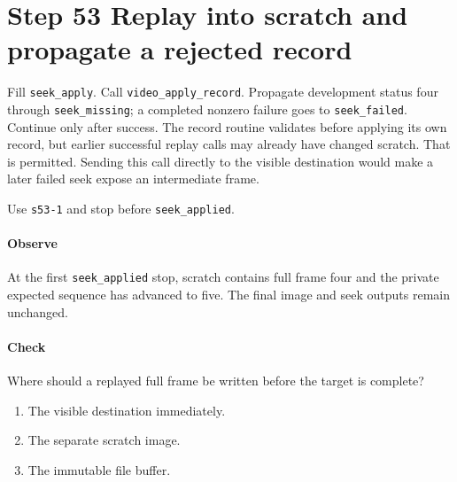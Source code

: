 \section{Step 53 Replay into scratch and propagate a rejected record}
Fill \texttt{seek\_apply}. Call \texttt{video\_apply\_record}. Propagate development status four through \texttt{seek\_missing}; a completed nonzero failure goes to \texttt{seek\_failed}. Continue only after success. The record routine validates before applying its own record, but earlier successful replay calls may already have changed scratch. That is permitted. Sending this call directly to the visible destination would make a later failed seek expose an intermediate frame.

Use \texttt{s53-1} and stop before \texttt{seek\_applied}.

\paragraph{Observe} At the first \texttt{seek\_applied} stop, scratch contains full frame four and the private expected sequence has advanced to five. The final image and seek outputs remain unchanged.

\paragraph{Check} Where should a replayed full frame be written before the target is complete?
\begin{enumerate}[label=\Alph*.]
  \item The visible destination immediately.
  \item The separate scratch image.
  \item The immutable file buffer.
\end{enumerate}
